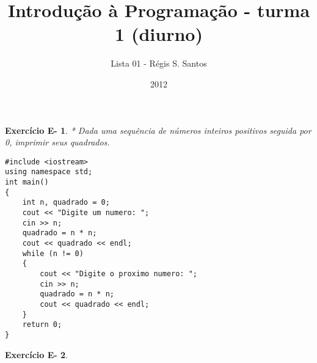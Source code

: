 \documentclass[a4paper]{article}
\title{Introdução à Programação - turma 1 (diurno)}
\author{Lista 01 - R\'egis S. Santos}
\date{2012}
\newtheorem{eex}{Exerc\'icio E-}
\begin{document}
\maketitle

\begin{eex}
* Dada uma sequ\^encia de n\'umeros inteiros positivos seguida por 0, imprimir seus quadrados.
\end{eex}

\begin{lstlisting}
#include <iostream>
using namespace std;
int main()
{
    int n, quadrado = 0;
    cout << "Digite um numero: ";
    cin >> n;
    quadrado = n * n;
    cout << quadrado << endl;
    while (n != 0)
    {
        cout << "Digite o proximo numero: ";
        cin >> n;
        quadrado = n * n;
        cout << quadrado << endl;
    }
    return 0;
}
\end{lstlisting}

\begin{eex}

\end{eex}

\begin{lstlisting}

\end{lstlisting}
\end{document}
